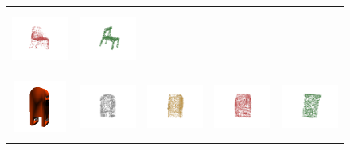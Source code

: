 \documentclass[bachelor, nocolorlinks, printoneside]{seuthesis} %
\begin{document}
\begin{Appendix}{}
\begin{figure}[!h]
\begin{tabular}{c@{}c@{}c@{}c@{}c@{}}
            \includegraphics[width=0.18\columnwidth,height=2cm]{figs/supp_real_dataset/AE/chair_fb8b45151900e6e016a0c57b9ceb6d01_pred.png} &
            \includegraphics[width=0.18\columnwidth,height=2cm]{figs/supp_real_dataset/oracle/chair_fb8b45151900e6e016a0c57b9ceb6d01_oracle.png} \\
            \vspace{-5mm}
            \includegraphics[width=0.11\columnwidth,height=1.7cm]{figs/supp_real_dataset/Image/mailbox_81f30bae0a1474fff601d2ded3aef05a.png} &
            \includegraphics[width=0.18\columnwidth,height=2cm]{figs/supp_real_dataset/GT/mailbox_81f30bae0a1474fff601d2ded3aef05a_gt.png} &
            \includegraphics[width=0.18\columnwidth,height=2cm]{figs/supp_real_dataset/AE_label/mailbox_81f30bae0a1474fff601d2ded3aef05a_label.png} &
            \includegraphics[width=0.18\columnwidth,height=2cm]{figs/supp_real_dataset/AE/mailbox_81f30bae0a1474fff601d2ded3aef05a_pred.png} &
            \includegraphics[width=0.18\columnwidth,height=2cm]{figs/supp_real_dataset/oracle/mailbox_81f30bae0a1474fff601d2ded3aef05a_oracle.png} \\

\end{tabular}
\end{figure}
\end{Appendix}
\end{document}
